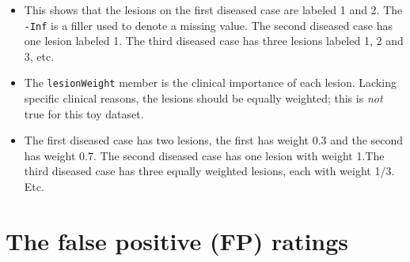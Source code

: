 \documentclass[
]{book}
\newenvironment{Shaded}{\begin{snugshade}}{\end{snugshade}}
\newcommand{\CommentTok}[1]{\textcolor[rgb]{0.56,0.35,0.01}{\textit{#1}}}
\newcommand{\NormalTok}[1]{#1}
\newcommand{\OperatorTok}[1]{\textcolor[rgb]{0.81,0.36,0.00}{\textbf{#1}}}
\providecommand{\tightlist}{%
  \setlength{\itemsep}{0pt}\setlength{\parskip}{0pt}}
\begin{document}
\begin{Shaded}
\end{Shaded}

\begin{itemize}
\tightlist
\item
  This shows that the lesions on the first diseased case are labeled 1 and 2. The \texttt{-Inf} is a filler used to denote a missing value. The second diseased case has one lesion labeled 1. The third diseased case has three lesions labeled 1, 2 and 3, etc.
\item
  The \texttt{lesionWeight} member is the clinical importance of each lesion. Lacking specific clinical reasons, the lesions should be equally weighted; this is \emph{not} true for this toy dataset.
\end{itemize}

\begin{Shaded}
\end{Shaded}

\begin{itemize}
\tightlist
\item
  The first diseased case has two lesions, the first has weight 0.3 and the second has weight 0.7. The second diseased case has one lesion with weight 1.The third diseased case has three equally weighted lesions, each with weight 1/3. Etc.
\end{itemize}

\hypertarget{the-false-positive-fp-ratings-1}{%
\section{The false positive (FP) ratings}\label{the-false-positive-fp-ratings-1}}
\end{document}
